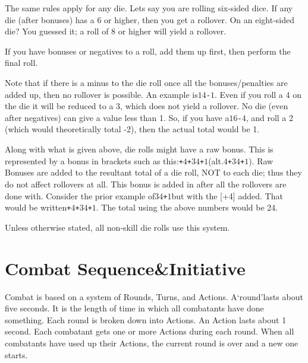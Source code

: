 \documentclass[twoside]{book}
\begin{document}
    {  
    The same rules apply for any die. Lets say you are rolling six-sided dice. If any die (after bonuses) has a 6 or higher, then you get a rollover. On an eight-sided die? You guessed it; a roll of 8 or higher will yield a rollover.
    }
  
    {  
    If you have bonuses or negatives to a roll, add them up first, then perform the final roll.
    }
  
    {  
    Note that if there is a minus to the die roll once all the bonuses/penalties are added up, then no rollover is possible. An example is\ensuremath{1}\ensuremath{4}\texttt{-}\ensuremath{1}. Even if you roll a 4 on the die it will be reduced to a 3, which does not yield a rollover. No die (even after negatives) can give a value less than 1. So, if you have a\ensuremath{1}\ensuremath{6}\texttt{-}\ensuremath{4}, and roll a 2 (which would theoretically total -2), then the actual total would be 1.
    }
  
    {  
    Along with what is given above, die rolls might have a raw bonus. This is represented by a bonus in brackets such as this:\texttt{+}\ensuremath{4}\texttt{+}\ensuremath{3}\ensuremath{4}\texttt{+}\ensuremath{1}\textscbf{}(alt.\ensuremath{4}\texttt{+}\ensuremath{3}\ensuremath{4}\texttt{+}\ensuremath{1}). Raw Bonuses are added to the resultant total of a die roll, NOT to each die; thus they do not affect rollovers at all. This bonus is added in after all the rollovers are done with. Consider the prior example of\ensuremath{3}\ensuremath{4}\texttt{+}\ensuremath{1}but with the [+4] added. That would be written\texttt{+}\ensuremath{4}\texttt{+}\ensuremath{3}\ensuremath{4}\texttt{+}\ensuremath{1}\textscbf{}. The total using the above numbers would be 24.
    }
  
    {  
    Unless otherwise stated, all non-skill die rolls use this system.
    }
  
    

\section{Combat Sequence\&Initiative}
    
    {  
    Combat is based on a system of Rounds, Turns, and Actions. A`round'lasts about five seconds. It is the length of time in which all combatants have done something. Each round is broken down into Actions. An Action lasts about 1 second. Each combatant gets one or more Actions during each round. When all combatants have used up their Actions, the current round is over and a new one starts.
    }
  
\end{document}
